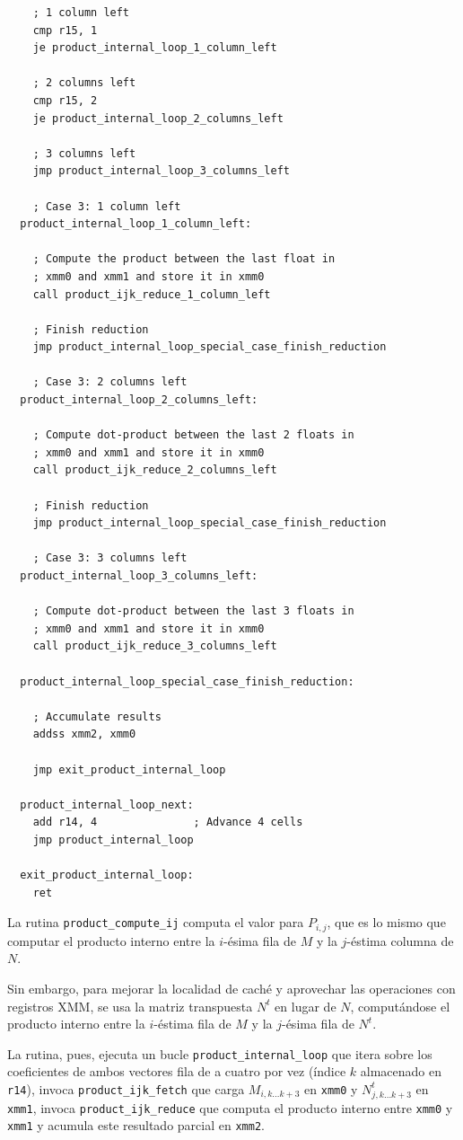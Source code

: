 \documentclass[a4paper, 10pt, twoside]{article}
\newcommand{\cc}[1]{\texttt{#1}}
\begin{document}
\begin{verbatim}
    ; 1 column left
    cmp r15, 1
    je product_internal_loop_1_column_left

    ; 2 columns left
    cmp r15, 2
    je product_internal_loop_2_columns_left

    ; 3 columns left
    jmp product_internal_loop_3_columns_left

    ; Case 3: 1 column left
  product_internal_loop_1_column_left:

    ; Compute the product between the last float in
    ; xmm0 and xmm1 and store it in xmm0
    call product_ijk_reduce_1_column_left

    ; Finish reduction
    jmp product_internal_loop_special_case_finish_reduction

    ; Case 3: 2 columns left
  product_internal_loop_2_columns_left:

    ; Compute dot-product between the last 2 floats in
    ; xmm0 and xmm1 and store it in xmm0
    call product_ijk_reduce_2_columns_left

    ; Finish reduction
    jmp product_internal_loop_special_case_finish_reduction

    ; Case 3: 3 columns left
  product_internal_loop_3_columns_left:

    ; Compute dot-product between the last 3 floats in
    ; xmm0 and xmm1 and store it in xmm0
    call product_ijk_reduce_3_columns_left

  product_internal_loop_special_case_finish_reduction:

    ; Accumulate results
    addss xmm2, xmm0

    jmp exit_product_internal_loop

  product_internal_loop_next:
    add r14, 4               ; Advance 4 cells
    jmp product_internal_loop

  exit_product_internal_loop:
    ret
\end{verbatim}

La rutina \cc{product\_compute\_ij} computa el valor para $P_{i,j}$, que es lo
mismo que computar el producto interno entre la $i$-ésima fila de $M$ y la
$j$-éstima columna de $N$.

Sin embargo, para mejorar la localidad de caché y aprovechar las operaciones
con registros XMM, se usa la matriz transpuesta $N^t$ en lugar de $N$,
computándose el producto interno entre la $i$-éstima fila de $M$ y la $j$-ésima
fila de $N^t$.

La rutina, pues, ejecuta un bucle \cc{product\_internal\_loop} que itera sobre
los coeficientes de ambos vectores fila de a cuatro por vez (índice $k$
almacenado en \cc{r14}), invoca \cc{product\_ijk\_fetch} que carga $M_{i,k
\ldots k+3}$ en \cc{xmm0} y $N^{t}_{j,k \ldots k+3}$ en \cc{xmm1}, invoca
\cc{product\_ijk\_reduce} que computa el producto interno entre \cc{xmm0} y
\cc{xmm1} y acumula este resultado parcial en \cc{xmm2}.
\end{document}
